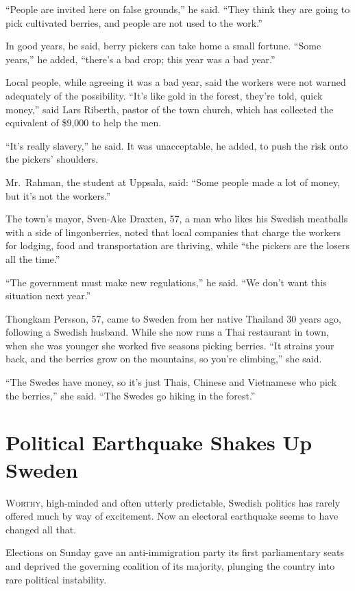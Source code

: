 ﻿\documentclass[12pt]{article}
\begin{document}
``People are invited here on false grounds,'' he said. ``They think they are going to pick
cultivated berries, and people are not used to the work.''

In good years, he said, berry pickers can take home a small fortune. ``Some years,'' he added,
``there's a bad crop; this year was a bad year.''

Local people, while agreeing it was a bad year, said the workers were not warned adequately of the
possibility. ``It's like gold in the forest, they're told, quick money,'' said Lars Riberth, pastor
of the town church, which has collected the equivalent of \$9,000 to help the men.

``It's really slavery,'' he said. It was unacceptable, he added, to push the risk onto the pickers'
shoulders.

Mr.~Rahman, the student at Uppsala, said: ``Some people made a lot of money, but it's not the
workers.''

The town's mayor, Sven-Ake Draxten, 57, a man who likes his Swedish meatballs with a side of
lingonberries, noted that local companies that charge the workers for lodging, food and
transportation are thriving, while ``the pickers are the losers all the time.''

``The government must make new regulations,'' he said. ``We don't want this situation next year.''

Thongkam Persson, 57, came to Sweden from her native Thailand 30 years ago, following a Swedish
husband. While she now runs a Thai restaurant in town, when she was younger she worked five seasons
picking berries. ``It strains your back, and the berries grow on the mountains, so you're
climbing,'' she said.

``The Swedes have money, so it's just Thais, Chinese and Vietnamese who pick the berries,'' she
said. ``The Swedes go hiking in the forest.''

\pagebreak
\section{Political Earthquake Shakes Up Sweden}

\lettrine{W}{orthy}, high-minded and often utterly predictable, Swedish
politics has rarely offered much by way of excitement. Now an electoral earthquake seems to have
changed all that.

Elections on Sunday gave an anti-immigration party its first parliamentary seats and deprived the
governing coalition of its majority, plunging the country into rare political instability.
\end{document}
